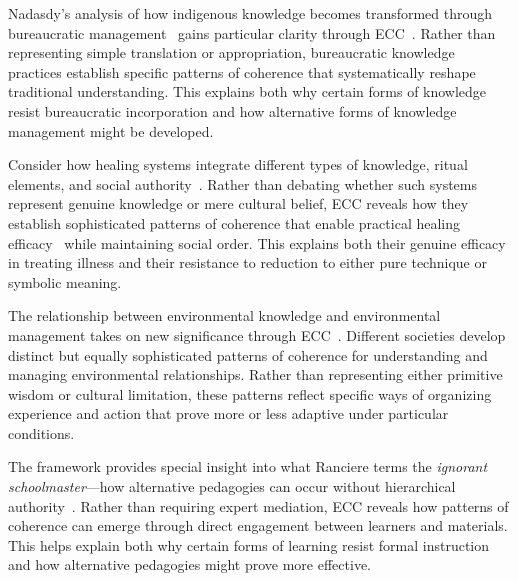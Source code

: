 Nadasdy's analysis of how indigenous knowledge becomes transformed through bureaucratic management~\cite{nadasdy2003hunters} gains particular clarity through ECC~\cite{ingold2011being}. Rather than representing simple translation or appropriation, bureaucratic knowledge practices establish specific patterns of coherence that systematically reshape traditional understanding. This explains both why certain forms of knowledge resist bureaucratic incorporation and how alternative forms of knowledge management might be developed.

Consider how healing systems integrate different types of knowledge, ritual elements, and social authority~\cite{scott1990domination,kohn2013how}. Rather than debating whether such systems represent genuine knowledge or mere cultural belief, ECC reveals how they establish sophisticated patterns of coherence that enable practical healing efficacy~ while maintaining social order. This explains both their genuine efficacy in treating illness and their resistance to reduction to either pure technique or symbolic meaning.

The relationship between environmental knowledge and environmental management takes on new significance through ECC~\cite{tsing2005friction,berkes2012sacred}. Different societies develop distinct but equally sophisticated patterns of coherence for understanding and managing environmental relationships. Rather than representing either primitive wisdom or cultural limitation, these patterns reflect specific ways of organizing experience and action that prove more or less adaptive under particular conditions.

The framework provides special insight into what Ranciere terms the \textit{ignorant schoolmaster}—how alternative pedagogies can occur without hierarchical authority~\cite{jackson1989knowledge}. Rather than requiring expert mediation, ECC reveals how patterns of coherence can emerge through direct engagement between learners and materials. This helps explain both why certain forms of learning resist formal instruction and how alternative pedagogies might prove more effective.

